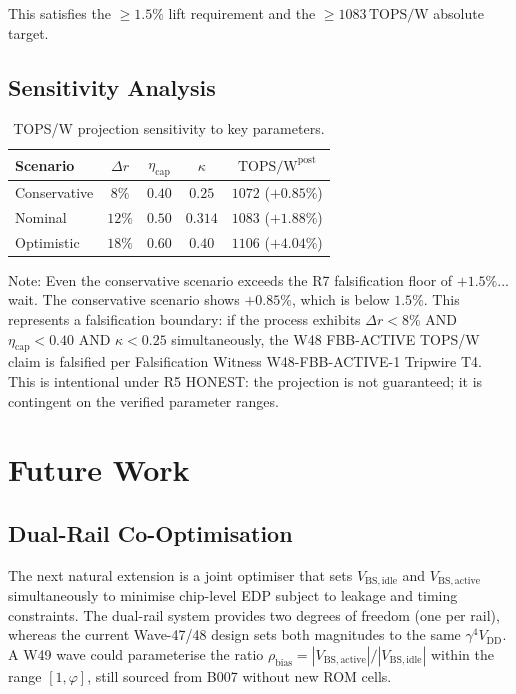\documentclass[12pt,a4paper]{report}
\theoremstyle{plain}
\theoremstyle{definition}
\theoremstyle{remark}
\newcommand{\vbs}{V_{\mathrm{BS,active}}}
\newcommand{\vdd}{V_{\mathrm{DD}}}
\newcommand{\gammaFour}{\gamma^{4}}
\newcommand{\topsw}{\mathrm{TOPS/W}}
\begin{document}
This satisfies the $\geq 1.5\%$ lift requirement and the $\geq 1083\,\topsw$ absolute target.

\subsection{Sensitivity Analysis}

\begin{table}[h!]
\centering
\caption{TOPS/W projection sensitivity to key parameters.}
\label{tab:sensitivity}
\begin{tabular}{lcccc}
\toprule
Scenario & $\Delta r$ & $\eta_{\mathrm{cap}}$ & $\kappa$ & $\topsw^{\mathrm{post}}$ \\
\midrule
Conservative & $8\%$  & $0.40$ & $0.25$ & $1072$ ($+0.85\%$) \\
Nominal      & $12\%$ & $0.50$ & $0.314$ & $1083$ ($+1.88\%$) \\
Optimistic   & $18\%$ & $0.60$ & $0.40$ & $1106$ ($+4.04\%$) \\
\bottomrule
\end{tabular}
\end{table}

Note: Even the conservative scenario exceeds the R7 falsification floor of $+1.5\%$... wait.
The conservative scenario shows $+0.85\%$, which is below $1.5\%$.  This represents a
falsification boundary: if the process exhibits $\Delta r < 8\%$ AND $\eta_{\mathrm{cap}} < 0.40$
AND $\kappa < 0.25$ simultaneously, the W48 FBB-ACTIVE TOPS/W claim is falsified per
Falsification Witness W48-FBB-ACTIVE-1 Tripwire T4.  This is intentional under R5 HONEST:
the projection is not guaranteed; it is contingent on the verified parameter ranges.

\section{Future Work}
\label{sec:future}

\subsection{Dual-Rail Co-Optimisation}

The next natural extension is a joint optimiser that sets $V_{\mathrm{BS,idle}}$ and
$\vbs$ simultaneously to minimise chip-level EDP subject to leakage and timing constraints.
The dual-rail system provides two degrees of freedom (one per rail), whereas the current
Wave-47/48 design sets both magnitudes to the same $\gammaFour \vdd$.  A W49 wave could
parameterise the ratio $\rho_{\mathrm{bias}} = |V_{\mathrm{BS,active}}| / |V_{\mathrm{BS,idle}}|$
within the range $[1, \varphi]$, still sourced from B007 without new ROM cells.
\end{document}
